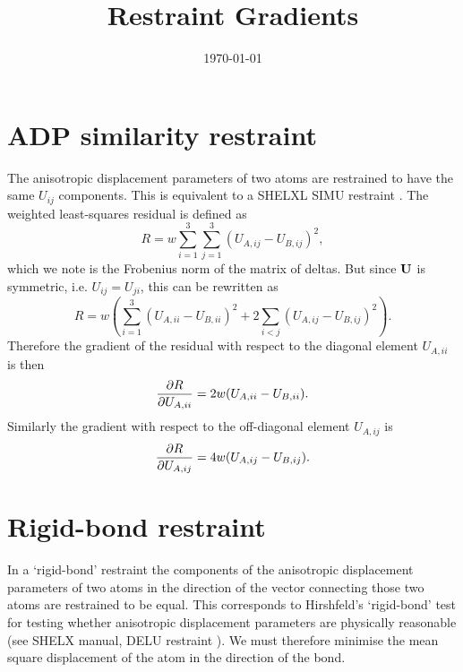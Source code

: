 \documentclass[11pt]{article}
\title{Restraint Gradients}
\author{\rjgildea}
\date{\today}
\begin{document}
\maketitle

\section{ADP similarity restraint}
\label{ADP:similarity}
The anisotropic displacement parameters of two atoms are restrained to have the
same $U_{ij}$ components.  This is equivalent to a SHELXL SIMU restraint \cite{SHELX:man97}.
The weighted least-squares residual is defined as
\begin{equation}
R = w \sum_{i=1}^3 \sum_{j=1}^3 (U_{A,ij} - U_{B,ij})^2,
\end{equation}
which we note is the Frobenius norm of the matrix of deltas.
But since $\mathbf{U}$ is symmetric, i.e. $U_{ij} = U_{ji}$, this can be rewritten as
\begin{equation}
R = w \left( \sum_{i=1}^3 (U_{A,ii} - U_{B,ii})^2 + 2 \sum_{i < j} (U_{A,ij} - U_{B,ij})^2 \right) .
\end{equation}
Therefore the gradient of the residual with respect to the diagonal element $U_{A,ii}$ is then
\begin{equation}
\frac{\partial R}{\partial U_{A,ii}} = 2w(U_{A,ii} - U_{B,ii}).
\end{equation}
Similarly the gradient with respect to the off-diagonal element $U_{A,ij}$ is
\begin{equation}
\frac{\partial R}{\partial U_{A,ij}} = 4w(U_{A,ij} - U_{B,ij}).
\end{equation}

\section{Rigid-bond restraint}

In a `rigid-bond' restraint the components of the anisotropic displacement parameters
of two atoms in the direction of the vector connecting those two atoms are restrained
to be equal.  This corresponds to Hirshfeld's `rigid-bond' test \cite{Hirshfeld:1976} for testing
whether anisotropic displacement parameters are physically reasonable (see SHELX
manual, DELU restraint \cite{SHELX:man97}).  We must therefore minimise the mean square displacement of
the atom in the direction of the bond.
\end{document}
